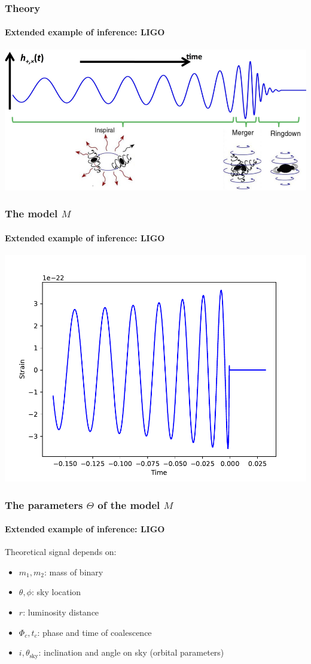 \documentclass[%
]{beamer}
\begin{document}
\begin{frame}
    \frametitle{Theory}
    \framesubtitle{Extended example of inference: LIGO}
    \includegraphics[width=\textwidth]{./figures/ligo_schematic.png}
\end{frame}

\begin{frame}
    \frametitle{The model $M$}
    \framesubtitle{Extended example of inference: LIGO}
    \includegraphics[width=\textwidth]{./figures/ligo_model.pdf}
\end{frame}

\begin{frame}
    \frametitle{The parameters $\Theta$ of the model $M$}
    \framesubtitle{Extended example of inference: LIGO}
    Theoretical signal depends on:
    \begin{itemize}
        \item $m_1, m_2$: mass of binary
        \item $\theta, \phi$: sky location
        \item $r$: luminosity distance 
        \item $\Phi_c, t_c$: phase and time of coalescence
        \item $i, \theta_\text{sky}$: inclination and angle on sky (orbital parameters)
    \end{itemize}
\end{frame}
\end{document}
